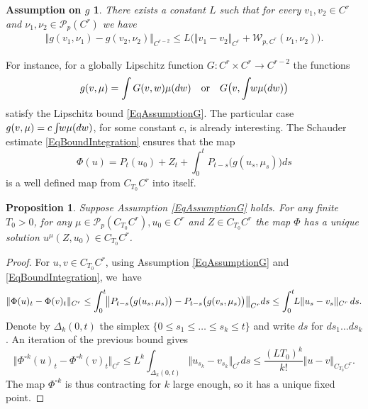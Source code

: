\documentclass[JEP,XML,SOM,Unicode,published]{cedram}
\newtheorem{prop}[thm]{Proposition}
\newtheorem*{assg}{Assumption on $g$}
\theoremstyle{definition}
\newcommand{\mcP}{\mathcal{P}}
\newcommand{\norme}[1]{\Vert #1 \Vert}
\begin{document}
\begin{assg}
There exists a constant $L$ such that for every $v_1, v_2\in C^r$ and $\nu_1,\nu_2 \in \mcP_p(C^r)$ we have
\begin{equation} \label{EqAssumptionG} \begin{split}
\big\Vert g(v_1, \nu_1) - g(v_2,\nu_2)\big\Vert _{C^{r-2}} \leq L\bigl( \norme{v_1-v_2} _{C^r} + \mathcal{W}_{p,C^r}(\nu_1,\nu_2) \bigr).
\end{split} \end{equation}
\end{assg}
For instance, for a globally Lipschitz function $G : C^r\times C^r\to C^{r-2}$ the functions
\[
g(v,\mu) = \int G(v,w)\mu(dw)\quad \textrm{or} \quad G\bigl(v,\int \hspace{-0.1cm}w\mu(dw)\bigr)
\]
satisfy the Lipschitz bound \eqref{EqAssumptionG}. The particular case $g(v,\mu)=c\int\hspace{-0.1cm}w\mu(dw)$, for some constant $c$, is already interesting. The Schauder estimate \eqref{EqBoundIntegration} ensures that the map
\[
\Phi(u) = P_t(u_0) + Z_t + \int_0^t P_{t-s} \bigl(g(u_s,\mu_s)\bigr) ds
\]
is a well defined map from $C_{T_0} C^r$ into itself.

\begin{prop}
Suppose Assumption \eqref{EqAssumptionG} holds. For any finite $T_0>0$, for any $\mu\in \mathcal{P}_p(C_{T_0} C^r), u_0\in C^r$ and $Z\in C_{T_0}C^r$ the map $\Phi$ has a unique solution $u^\mu(Z,u_0)\in C_{T_0}C^r$.
\end{prop}

\begin{proof}
For $u,v\in C_{T_0}C^r$, using Assumption \eqref{EqAssumptionG} and \eqref{EqBoundIntegration}, we~have
\[
\norme{\Phi(u)_t-\Phi(v)_t}_{C^r} \leq \int_0^t\hspace*{-1mm} \big\Vert P_{t-s}\bigl(g(u_s,\mu_s)\bigr) - P_{t-s}\bigl(g(v_s,\mu_s)\bigr)\big\Vert_{C^r} ds \leq \int_0^t\hspace*{-1mm} L \norme{u_s-v_s}_{C^r} \, ds.
\]
Denote by $\Delta_k(0,t)$ the simplex $\{0\leq s_1 \leq \dots\leq s_k\leq t\} $ and write $ds$ for $ds_1\dots ds_k$. An iteration of the previous bound gives
\[
\norme{\Phi^{\circ k}(u)_t - \Phi^{\circ k}(v)_t}_{C^r} \leq L^k \int_{\Delta_k(0,t)} \norme{u_{s_k}-v_{s_k}}_{C^r} ds \leq\frac{(LT_0)^k}{k!} \norme{u-v}_{C_{T_0}C^r}.
\]
The map $\Phi^{ \circ k}$ is thus contracting for $k$ large enough, so it has a unique fixed point.
\end{proof}
\end{document}
